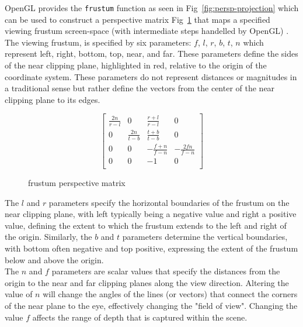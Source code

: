 OpenGL provides the \texttt{frustum} function as seen in Fig~\ref{fig:persp-projection} which can be used to construct a perspective matrix Fig~\ref{fig:perspective-matrix} that maps a specified viewing frustum  screen-space (with intermediate steps handelled by OpenGL) \tocite. The viewing frustum, is specified by six parameters: $f$, $l$, $r$, $b$, $t$, $n$ which represent left, right, bottom, top, near, and far. These parameters define the sides of the near clipping plane, highlighted in red, relative to the origin of the coordinate system. These parameters do not represent distances or magnitudes in a traditional sense but rather define the vectors from the center of the near clipping plane to its edges. \\

\begin{figure}[H]
    \[
        \begin{bmatrix}
            \frac{2n}{r-l} & 0              & \frac{r+l}{r-l}  & 0                \\
            0              & \frac{2n}{t-b} & \frac{t+b}{t-b}  & 0                \\
            0              & 0              & -\frac{f+n}{f-n} & -\frac{2fn}{f-n} \\
            0              & 0              & -1               & 0                \\
        \end{bmatrix}
    \]
    \caption{frustum perspective matrix}
    \label{fig:perspective-matrix}
\end{figure}

The $l$ and $r$ parameters specify the horizontal boundaries of the frustum on the near clipping plane, with left typically being a negative value and right a positive value, defining the extent to which the frustum extends to the left and right of the origin. Similarly, the $b$ and $t$ parameters determine the vertical boundaries, with bottom often negative and top positive, expressing the extent of the frustum below and above the origin. \\

The $n$ and $f$ parameters are scalar values that specify the distances from the origin to the near and far clipping planes along the view direction. Altering the value of $n$ will change the angles of the lines (or vectors) that connect the corners of the near plane to the eye, effectively changing the "field of view". Changing the value $f$ affects the range of depth that is captured within the scene. \\


